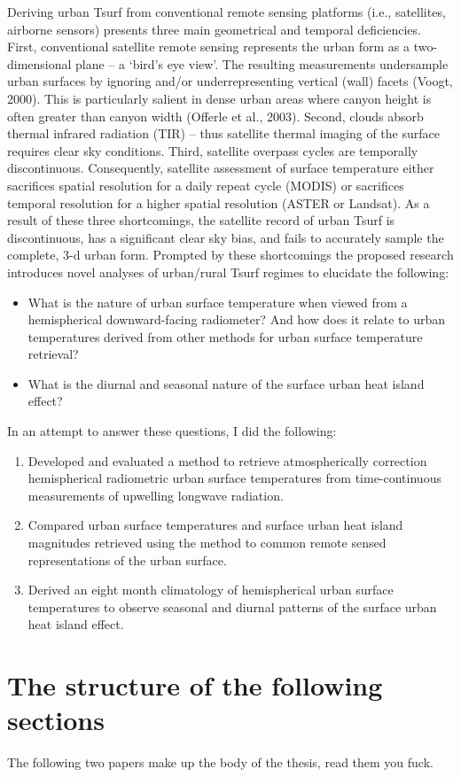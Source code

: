 Deriving urban Tsurf from conventional remote sensing platforms (i.e., satellites, airborne sensors) presents three main geometrical and temporal deficiencies. First, conventional satellite remote sensing represents the urban form as a two-dimensional plane – a ‘bird’s eye view’. The resulting measurements undersample urban surfaces by ignoring and/or underrepresenting vertical (wall) facets (Voogt, 2000). This is particularly salient in dense urban areas where canyon height is often greater than canyon width (Offerle et al., 2003). Second, clouds absorb thermal infrared radiation (TIR) – thus satellite thermal imaging of the surface requires clear sky conditions. Third, satellite overpass cycles are temporally discontinuous. Consequently, satellite assessment of surface temperature either sacrifices spatial resolution for a daily repeat cycle (MODIS) or sacrifices temporal resolution for a higher spatial resolution (ASTER or Landsat). As a result of these three shortcomings, the satellite record of urban Tsurf is discontinuous, has a significant clear sky bias, and fails to accurately sample the complete, 3-d urban form. Prompted by these shortcomings the proposed research introduces novel analyses of urban/rural Tsurf regimes to elucidate the following:

\begin{itemize}
	\item What is the nature of urban surface temperature when viewed from a hemispherical downward-facing radiometer? And how does it relate to urban temperatures derived from other methods for urban surface temperature retrieval?
	\item What is the diurnal and seasonal nature of the surface urban heat island effect?
\end{itemize}

\noindent In an attempt to answer these questions, I did the following:

\begin{enumerate}
	\item Developed and evaluated a method to retrieve atmospherically correction hemispherical radiometric urban surface temperatures from time-continuous measurements of upwelling longwave radiation.
	\item Compared urban surface temperatures and surface urban heat island magnitudes retrieved using the method to common remote sensed representations of the urban surface.
	\item Derived an eight month climatology of hemispherical urban surface temperatures to observe seasonal and diurnal patterns of the surface urban heat island effect.
\end{enumerate}

\section{The structure of the following sections}

The following two papers make up the body of the thesis, read them you fuck.